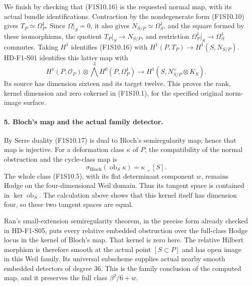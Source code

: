 We finish by checking that (F1S10.16) is the requested
normal map, with its actual bundle identifications.
Contraction by the nondegenerate form (F1S10.10) gives
$T_P\simeq\Omega_P^1$. Since $\Omega|_S=0$, it also
gives $N_{S/P}\simeq\Omega_S^1$, and the square
formed by these isomorphisms, the quotient
$T_P|_S\to N_{S/P}$, and restriction
$\Omega_P^1|_S\to\Omega_S^1$ commutes.
Taking $H^1$ identifies (F1S10.16) with
$H^1(P,T_P)\to H^1(S,N_{S/P})$.
HD-F1-S01 identifies this latter map with
\[
 H^1(P,\mathcal O_P)\otimes\bigwedge^3H^0(P,\Omega_P^1)
       \longrightarrow H^1(S,N_{S/P}^{\vee}\otimes K_S).
 \tag{F1S10.17}
\]
Its source has dimension sixteen and its target twelve.
This proves the rank, kernel dimension and zero cokernel
in (F1S10.1), for the specified original norm-image surface.

\paragraph{5. Bloch's map and the actual family detector.}
By Serre duality (F1S10.17) is dual to Bloch's
semiregularity map; hence that map is injective.
For a deformation class $\kappa$ of $P$, the compatibility
of the normal obstruction and the cycle-class map is
\[
                  \sigma_{\mathrm{Bloch}}(\operatorname{ob}_S\kappa)
                                =\kappa\mathbin{\lrcorner}[S].
 \tag{F1S10.18}
\]
The whole class (F1S10.5), with its flat determinant
component $w$, remains Hodge on the four-dimensional
Weil domain. Thus its tangent space is contained in
$\ker\operatorname{ob}_S$. The calculation above shows
that this kernel itself has dimension four, so these
two tangent spaces are equal.

Ran's small-extension semiregularity theorem, in the
precise form already checked in HD-F1-S05, puts every
relative embedded obstruction over the full-class Hodge
locus in the kernel of Bloch's map. That kernel is zero
here. The relative Hilbert morphism is therefore smooth
at the actual point $[S\subset P]$ and has open image
in this Weil family. Its universal subscheme supplies
actual nearby smooth embedded detectors of degree $36$.
This is the family conclusion of the computed map,
and it preserves the full class $\beta^2/6+w$.

